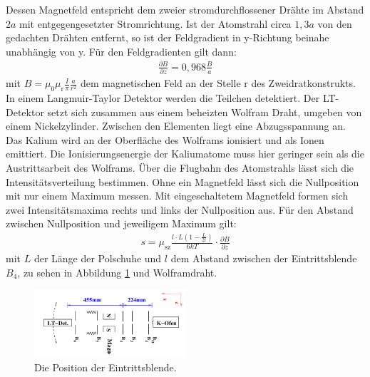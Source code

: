 Dessen Magnetfeld entspricht dem zweier stromdurchflossener Drähte im Abstand $2a$
mit entgegengesetzter Stromrichtung.
Ist der Atomstrahl circa $1,3a$ von den gedachten Drähten entfernt, so ist
der Feldgradient in y-Richtung beinahe unabhängig von y.
Für den Feldgradienten gilt dann:
\begin{align}
  \frac{\partial B}{\partial z}=0,968\frac{B}{a}
\end{align}
mit $B=\mu_\mathrm{0}\mu_\mathrm{r}\frac{I}{\pi}\frac{a}{r^2}$ dem magnetischen
Feld an der Stelle r des Zweidratkonstrukts.
In einem Langmuir-Taylor Detektor werden die Teilchen detektiert.
Der LT-Detektor setzt sich zusammen aus einem beheizten Wolfram Draht, umgeben
von einem Nickelzylinder. Zwischen den Elementen liegt eine Abzugsspannung an.
Das Kalium wird an der Oberfläche des Wolframs
ionisiert und als Ionen emittiert. Die Ionisierungsenergie der Kaliumatome
muss hier geringer sein als die Austrittsarbeit des Wolframs.
Über die Flugbahn des Atomstrahls lässt sich die Intensitätsverteilung
bestimmen. Ohne ein Magnetfeld lässt sich die Nullposition mit nur einem
Maximum messen. Mit eingeschaltetem Magnetfeld formen sich zwei Intensitätsmaxima
rechts und links der Nullposition aus.
Für den Abstand zwischen Nullposition und jeweiligem Maximum gilt:
\begin{align}
 s=\mu_\mathrm{sz}\frac{l\cdot L\left(1-\frac{L}{2l}\right)}{6kT}\cdot\frac{\partial B}{\partial z} \label{eqn:abstand}
\end{align}
mit $L$ der Länge der Polschuhe und $l$ dem Abstand zwischen
der Eintrittsblende $B_\mathrm{4}$, zu sehen in Abbildung \ref{fig:schema} und Wolframdraht.
\begin{figure}
   \centering
    \includegraphics[width=0.5\textwidth]{schema.PNG}
    \caption{Die Position der Eintrittsblende.\cite{skript}}
    \label{fig:schema}
    \FloatBarrier
\end{figure}
